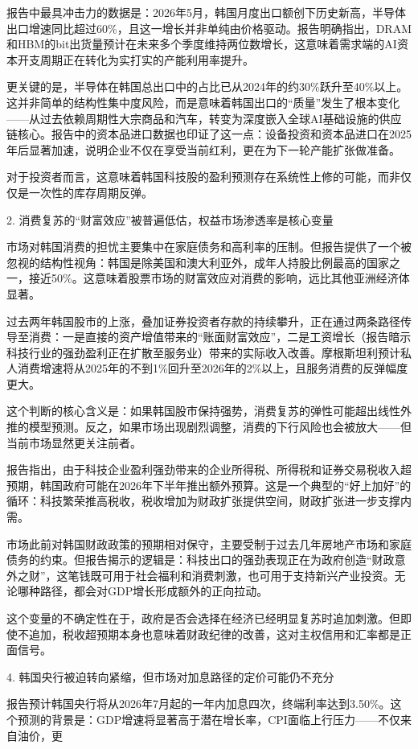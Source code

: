 \documentclass[11pt]{ctexart}
\begin{document}
报告中最具冲击力的数据是：2026年5月，韩国月度出口额创下历史新高，半导体出口增速同比超过60\%，且这一增长并非单纯由价格驱动。报告明确指出，DRAM和HBM的bit出货量预计在未来多个季度维持两位数增长，这意味着需求端的AI资本开支周期正在转化为实打实的产能利用率提升。

更关键的是，半导体在韩国总出口中的占比已从2024年的约30\%跃升至40\%以上。这并非简单的结构性集中度风险，而是意味着韩国出口的“质量”发生了根本变化——从过去依赖周期性大宗商品和汽车，转变为深度嵌入全球AI基础设施的供应链核心。报告中的资本品进口数据也印证了这一点：设备投资和资本品进口在2025年后显著加速，说明企业不仅在享受当前红利，更在为下一轮产能扩张做准备。

对于投资者而言，这意味着韩国科技股的盈利预测存在系统性上修的可能，而非仅仅是一次性的库存周期反弹。

2. 消费复苏的“财富效应”被普遍低估，权益市场渗透率是核心变量

市场对韩国消费的担忧主要集中在家庭债务和高利率的压制。但报告提供了一个被忽视的结构性视角：韩国是除美国和澳大利亚外，成年人持股比例最高的国家之一，接近50\%。这意味着股票市场的财富效应对消费的影响，远比其他亚洲经济体显著。

过去两年韩国股市的上涨，叠加证券投资者存款的持续攀升，正在通过两条路径传导至消费：一是直接的资产增值带来的“账面财富效应”，二是工资增长（报告暗示科技行业的强劲盈利正在扩散至服务业）带来的实际收入改善。摩根斯坦利预计私人消费增速将从2025年的不到1\%回升至2026年的2\%以上，且服务消费的反弹幅度更大。

这个判断的核心含义是：如果韩国股市保持强势，消费复苏的弹性可能超出线性外推的模型预测。反之，如果市场出现剧烈调整，消费的下行风险也会被放大——但当前市场显然更关注前者。

报告指出，由于科技企业盈利强劲带来的企业所得税、所得税和证券交易税收入超预期，韩国政府可能在2026年下半年推出额外预算。这是一个典型的“好上加好”的循环：科技繁荣推高税收，税收增加为财政扩张提供空间，财政扩张进一步支撑内需。

市场此前对韩国财政政策的预期相对保守，主要受制于过去几年房地产市场和家庭债务的约束。但报告揭示的逻辑是：科技出口的强劲表现正在为政府创造“财政意外之财”，这笔钱既可用于社会福利和消费刺激，也可用于支持新兴产业投资。无论哪种路径，都会对GDP增长形成额外的正向拉动。

这个变量的不确定性在于，政府是否会选择在经济已经明显复苏时追加刺激。但即使不追加，税收超预期本身也意味着财政纪律的改善，这对主权信用和汇率都是正面信号。

4. 韩国央行被迫转向紧缩，但市场对加息路径的定价可能仍不充分

报告预计韩国央行将从2026年7月起的一年内加息四次，终端利率达到3.50\%。这个预测的背景是：GDP增速将显著高于潜在增长率，CPI面临上行压力——不仅来自油价，更
\end{document}
